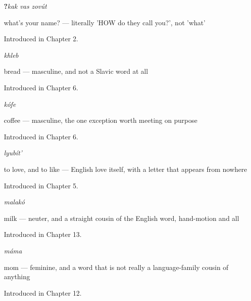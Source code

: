 \noindent\begin{minipage}[t]{\linewidth}
\raggedright
\textbf{  ?}\enspace\emph{kak vas zovút}\par
\small what's your name? — literally 'HOW do they call you?', not 'what'\par
\footnotesize Introduced in Chapter 2.
\end{minipage}\par\medskip

\noindent\begin{minipage}[t]{\linewidth}
\raggedright
\textbf{}\enspace\emph{khleb}\par
\small bread — masculine, and not a Slavic word at all\par
\footnotesize Introduced in Chapter 6.
\end{minipage}\par\medskip

\noindent\begin{minipage}[t]{\linewidth}
\raggedright
\textbf{}\enspace\emph{kófe}\par
\small coffee — masculine, the one exception worth meeting on purpose\par
\footnotesize Introduced in Chapter 6.
\end{minipage}\par\medskip

\noindent\begin{minipage}[t]{\linewidth}
\raggedright
\textbf{}\enspace\emph{lyubít'}\par
\small to love, and to like — English love itself, with a letter that appears from nowhere\par
\footnotesize Introduced in Chapter 5.
\end{minipage}\par\medskip

\noindent\begin{minipage}[t]{\linewidth}
\raggedright
\textbf{}\enspace\emph{malakó}\par
\small milk — neuter, and a straight cousin of the English word, hand-motion and all\par
\footnotesize Introduced in Chapter 13.
\end{minipage}\par\medskip

\noindent\begin{minipage}[t]{\linewidth}
\raggedright
\textbf{}\enspace\emph{máma}\par
\small mom — feminine, and a word that is not really a language-family cousin of anything\par
\footnotesize Introduced in Chapter 12.
\end{minipage}\par\medskip

